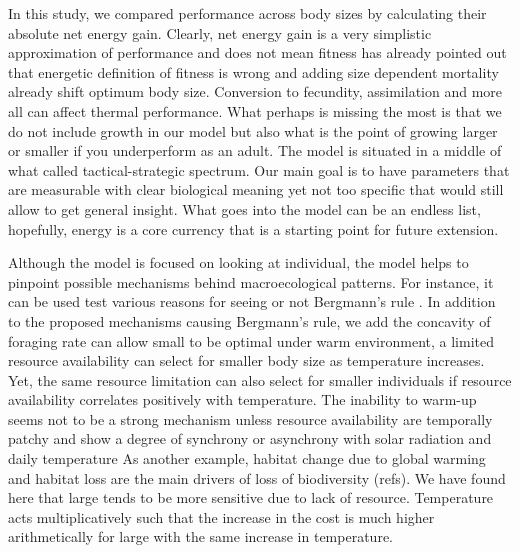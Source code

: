 In this study, we compared performance across body sizes by calculating their absolute net energy gain.
Clearly, net energy gain is a very simplistic approximation of performance and does not mean fitness
\citet{Kozlowski1996} has already pointed out that energetic definition of fitness is wrong and adding size dependent mortality already shift optimum body size.
Conversion to fecundity, assimilation and more all can affect thermal performance.
What perhaps is missing the most is that we do not include growth in our model but also what is the point of growing larger or smaller if you underperform as an adult. 
The model is situated in a middle of what \citet{Holling1966} called tactical-strategic spectrum.
Our main goal is to have parameters that are measurable with clear biological meaning yet not too specific that would still allow to get general insight. 
What goes into the model can be an endless list, hopefully, energy is a core currency that is a starting point for future extension.

Although the model is focused on looking at individual, the model helps to pinpoint possible mechanisms behind macroecological patterns.
For instance, it can be used test various reasons for seeing or not Bergmann's rule \citep{Blackburn1999}.
In addition to the proposed mechanisms causing Bergmann's rule, we add the concavity of foraging rate can allow small to be optimal under warm environment, a limited resource availability can select for smaller body size as temperature increases. 
Yet, the same resource limitation can also select for smaller individuals if resource availability correlates positively with temperature.
The inability to warm-up seems not to be a strong mechanism unless resource availability are temporally patchy and show a degree of synchrony or asynchrony with solar radiation and daily temperature 
As another example, habitat change due to global warming and habitat loss are the main drivers of loss of biodiversity (refs).
We have found here that large tends to be more sensitive due to lack of resource.
Temperature acts multiplicatively such that the increase in the cost is much higher arithmetically for large with the same increase in temperature. %

